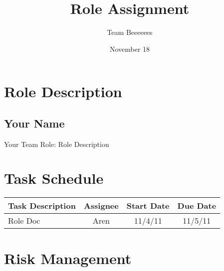 \documentclass[12pt, letterpaper]{article}
\begin{document}
\title{Role Assignment}
\author{Team Beeeeees}
\date{November 18}
\maketitle
\section{Role Description}
  \subsection{Your Name}
  Your Team Role: Role Description
\section{Task Schedule}
\begin{center}
  \begin{tabular}{l || c | c | c | }
    Task Description & Assignee & Start Date & Due Date \\
    \hline
    Role Doc & Aren & 11/4/11 & 11/5/11 \\
    \hline
  \end{tabular}
\end{center}

\section{Risk Management}
\end{document}
